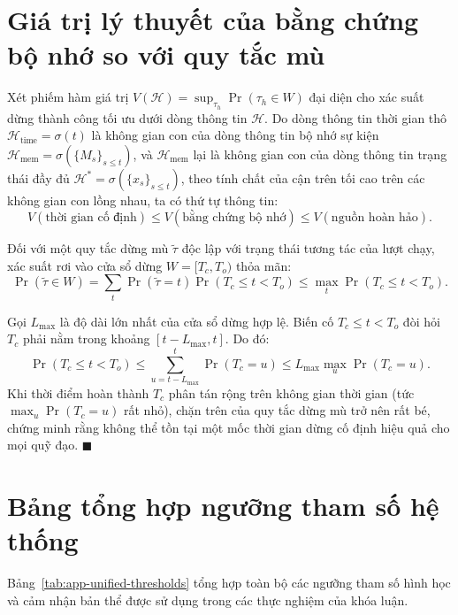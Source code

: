 \section{Giá trị lý thuyết của bằng chứng bộ nhớ so với quy tắc mù}
\label{sec:app-value-of-evidence}

Xét phiếm hàm giá trị $V(\mathcal H) = \sup_{\tau_h} \Pr(\tau_h \in W)$ đại diện cho xác suất dừng thành công tối ưu dưới dòng thông tin $\mathcal H$.
Do dòng thông tin thời gian thô $\mathcal H_{\text{time}} = \sigma(t)$ là không gian con của dòng thông tin bộ nhớ sự kiện $\mathcal H_{\text{mem}} = \sigma(\{M_s\}_{s \le t})$, và $\mathcal H_{\text{mem}}$ lại là không gian con của dòng thông tin trạng thái đầy đủ $\mathcal H^* = \sigma(\{x_s\}_{s \le t})$, theo tính chất của cận trên tối cao trên các không gian con lồng nhau, ta có thứ tự thông tin:
\begin{equation}
V(\text{thời gian cố định}) \le V(\text{bằng chứng bộ nhớ}) \le V(\text{nguồn hoàn hảo}).
\end{equation}

Đối với một quy tắc dừng mù $\tilde\tau$ độc lập với trạng thái tương tác của lượt chạy, xác suất rơi vào cửa sổ dừng $W = [T_c, T_o)$ thỏa mãn:
\begin{equation}
\Pr(\tilde\tau \in W) = \sum_t \Pr(\tilde\tau = t) \Pr(T_c \le t < T_o) \le \max_t \Pr(T_c \le t < T_o).
\end{equation}

Gọi $L_{\max}$ là độ dài lớn nhất của cửa sổ dừng hợp lệ. Biến cố $T_c \le t < T_o$ đòi hỏi $T_c$ phải nằm trong khoảng $[t - L_{\max}, t]$. Do đó:
\begin{equation}
\Pr(T_c \le t < T_o) \le \sum_{u = t - L_{\max}}^t \Pr(T_c = u) \le L_{\max} \max_u \Pr(T_c = u).
\end{equation}
Khi thời điểm hoàn thành $T_c$ phân tán rộng trên không gian thời gian (tức $\max_u \Pr(T_c = u)$ rất nhỏ), chặn trên của quy tắc dừng mù trở nên rất bé, chứng minh rằng không thể tồn tại một mốc thời gian dừng cố định hiệu quả cho mọi quỹ đạo. $\blacksquare$

\section{Bảng tổng hợp ngưỡng tham số hệ thống}
\label{sec:app-threshold-table}

Bảng~\ref{tab:app-unified-thresholds} tổng hợp toàn bộ các ngưỡng tham số hình học và cảm nhận bản thể được sử dụng trong các thực nghiệm của khóa luận.

